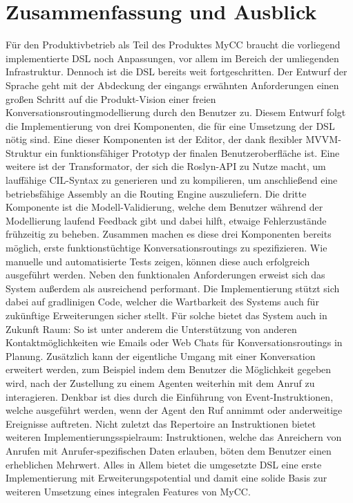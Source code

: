 \chapter{Zusammenfassung und Ausblick}
Für den Produktivbetrieb als Teil des Produktes MyCC braucht die vorliegend implementierte DSL noch Anpassungen, vor allem im Bereich der umliegenden Infrastruktur. 
Dennoch ist die DSL bereits weit fortgeschritten. Der Entwurf der Sprache geht mit der Abdeckung der eingangs erwähnten Anforderungen einen großen Schritt auf die Produkt-Vision einer freien Konversationsroutingmodellierung durch den Benutzer zu. Diesem Entwurf folgt die Implementierung von drei Komponenten, die für eine Umsetzung der DSL nötig sind. Eine dieser Komponenten ist der Editor, der dank flexibler MVVM-Struktur ein funktionsfähiger Prototyp der finalen Benutzeroberfläche ist. Eine weitere ist der Transformator, der sich die Roslyn-API zu Nutze macht, um lauffähige CIL-Syntax zu generieren und zu kompilieren, um anschließend eine betriebsfähige Assembly an die Routing Engine auszuliefern. Die dritte Komponente ist die  Modell-Validierung, welche dem Benutzer während der Modellierung laufend Feedback gibt und dabei hilft, etwaige Fehlerzustände frühzeitig zu beheben. 
\newline
Zusammen machen es diese drei Komponenten bereits möglich, erste funktionstüchtige Konversationsroutings zu spezifizieren. Wie manuelle und automatisierte Tests zeigen, können diese auch erfolgreich ausgeführt werden. Neben den funktionalen Anforderungen erweist sich das System außerdem als ausreichend performant. Die Implementierung stützt sich dabei auf gradlinigen Code, welcher die Wartbarkeit des Systems auch für zukünftige Erweiterungen sicher stellt. 
\newline
Für solche bietet das System auch in Zukunft Raum: So ist unter anderem die Unterstützung von anderen Kontaktmöglichkeiten wie Emails oder Web Chats für Konversationsroutings in Planung. Zusätzlich kann der eigentliche Umgang mit einer Konversation erweitert werden, zum Beispiel indem dem Benutzer die Möglichkeit gegeben wird, nach der Zustellung zu einem Agenten weiterhin mit dem Anruf zu interagieren. Denkbar ist dies durch die Einführung von Event-Instruktionen, welche ausgeführt werden, wenn der Agent den Ruf annimmt oder anderweitige Ereignisse auftreten. Nicht zuletzt das Repertoire an Instruktionen bietet weiteren Implementierungsspielraum: Instruktionen, welche das Anreichern von Anrufen mit Anrufer-spezifischen Daten erlauben, böten dem Benutzer einen erheblichen Mehrwert. Alles in Allem bietet die umgesetzte DSL eine erste Implementierung mit Erweiterungspotential und damit eine solide Basis zur weiteren 
Umsetzung eines integralen Features von MyCC.